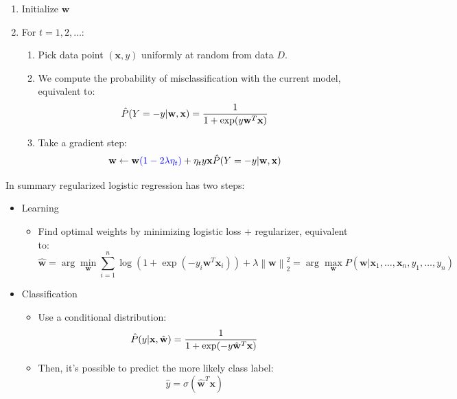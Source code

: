 \documentclass[a4paper,10pt,twoside]{article}
\newcommand\norm[1]{\left\lVert#1\right\rVert}
\begin{document}
\begin{enumerate}
  \item Initialize $\mathbf{w}$
  \item For $t=1,2,\ldots$:
    \begin{enumerate}
    \item Pick data point $(\mathbf{x},y)$ uniformly at random from data $D$.
    \item We compute the probability of misclassification with the current model, equivalent to:
        \begin{equation*}
          \hat{P}(Y=-y|\mathbf{w},\mathbf{x}) = {1\over 1+\exp(y\mathbf{w}^T\mathbf{x})}
        \end{equation*}
     \item Take a gradient step:
       \begin{equation*}
         \mathbf{w}\leftarrow\mathbf{w}\textcolor{blue}{(1-2\lambda\eta_t)}+\eta_ty\mathbf{x}\hat{P}(Y=-y|\mathbf{w},\mathbf{x})
       \end{equation*}
    \end{enumerate}
\end{enumerate}

In summary regularized logistic regression has two steps:
\begin{itemize}
\item Learning
  \begin{itemize}
  \item Find optimal weights by minimizing logistic loss + regularizer, equivalent to:
  \begin{equation*}
    \hat{\mathbf{w}} = \arg\min_{\mathbf{w}}\sum_{i=1}^{n}\log(1+\exp(-y_i\mathbf{w}^T\mathbf{x}_i))+\lambda\norm{\mathbf{w}}_2^2
    = \arg\max_{\mathbf{w}}P(\mathbf{w}|\mathbf{x}_1,\ldots,\mathbf{x}_n,y_1,\ldots,y_n)
  \end{equation*}
  \end{itemize}
\item Classification
  \begin{itemize}
  \item Use a conditional distribution:
    \begin{equation*}
      \hat{P}(y|\mathbf{x},\hat{\mathbf{w}}) = {1\over 1+\exp(-y\hat{\mathbf{w}}^T\mathbf{x})}
    \end{equation*}
  \item Then, it's possible to predict the more likely class label:
  \begin{equation*}
    \hat{y}=\sigma(\hat{\mathbf{w}}^T\mathbf{x})
  \end{equation*}
  \end{itemize}
\end{itemize}
\end{document}
